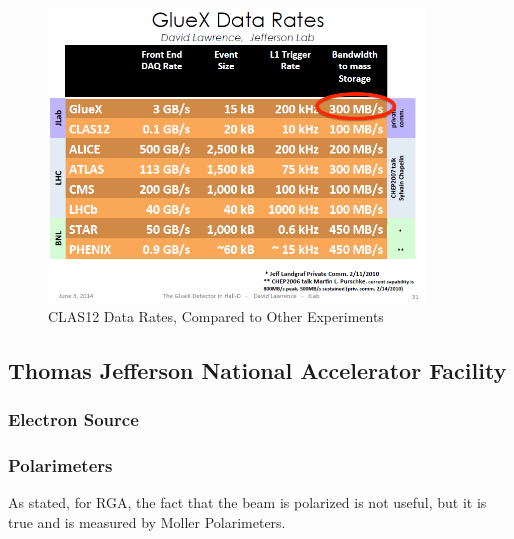     \begin{figure}[H]
        \centering
        \includegraphics[width=10cm]{Chapters/Ch2-Experiment/clas-12-system/pics/other/good_data_rates_slide.PNG}
        \caption{CLAS12 Data Rates, Compared to Other Experiments }
    \end{figure}

    
        \subsection{Thomas Jefferson National Accelerator Facility}
            \subsubsection{Electron Source}    
            \subsubsection{Polarimeters}
                    As stated, for RGA, the fact that the beam is polarized is not useful, but it is true and is measured by Moller Polarimeters. 
    
           
    
